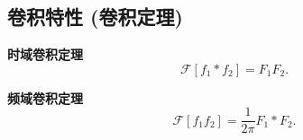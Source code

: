 \subsection{卷积特性 (卷积定理)} \label{3 卷积特性 (卷积定理)}
\textbf{时域卷积定理}
\begin{equation}
    \mathcal{F}[f_1*f_2]=F_1F_2.
\end{equation}

\textbf{频域卷积定理}
\begin{equation}
    \mathcal{F}[f_1f_2]=\frac{1}{2\pi}F_1*F_2.
\end{equation}
